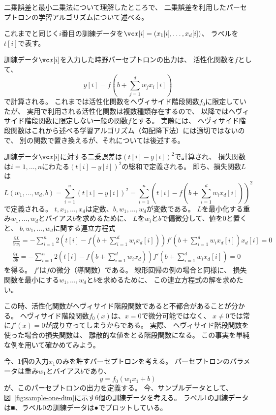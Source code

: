 二乗誤差と最小二乗法について理解したところで、
二乗誤差を利用したパーセプトロンの学習アルゴリズムについて述べる。

これまでと同じく$i$番目の訓練データを$\vc x[i] = (x_1[i], \dots, x_d[i])$、
ラベルを$t[i]$で表す。

訓練データ$\vc x[i]$を入力した時野パーセプトロンの出力は、
活性化関数を$f$として、
\[
  y[i] = f\left(b + \sum_{j=1}^d w_j x_i[i]\right)
\]
で計算される。
これまでは活性化関数をヘヴィサイド階段関数$f_0$に限定していたが、
実用で利用される活性化関数は複数種類存在するので、
以降ではヘヴィサイド階段関数に限定しない一般の関数$f$とする。
実際には、
ヘヴィサイド階段関数はこれから述べる学習アルゴリズム（勾配降下法）には適切ではないので、
別の関数で置き換えるが、それについては後述する。

訓練データ$\vc x[i]$に対する二乗誤差は$(t[i] - y[i])^2$で計算され、
損失関数は$i = 1, \dots, n$にわたる$(t[i] - y[i])^2$の総和で定義される。
即ち、損失関数$L$は
\[
  L(w_1, \dots, w_d, b)
  = \sum_{i=1}^n (t[i] - y[i])^2
  = \sum_{i=1}^n \left(t[i] - f\left(b + \sum_{i=1}^d w_i x_d[i]\right)\right)^2
\]
で定義される。
$t, x_1, \dots, x_d$は定数、$b, w_1, \dots, w_d$が変数である。
$L$を最小化する重み$w_1, \dots, w_d$とバイアス$b$を求めるために、
$L$を$w_i$と$b$で偏微分して、値を0と置くと、
$b, w_1, \dots, w_d$に関する連立方程式
\begin{align}
  &\label{eq:8}
    \frac{\partial L}{\partial w_i}
    = - \sum_{i=1}^n 
    2 \left(t[i] - f\left(b + \sum_{i=1}^d w_i x_d[i]\right)\right)
    f'\left(b + \sum_{i=1}^d w_i x_d[i]\right) x_d[i] = 0
  \\&\label{eq:9}
  \frac{\partial L}{\partial b}
  = - \sum_{i=1}^n 
  2 \left(t[i] - f\left(b + \sum_{i=1}^d w_i x_d\right)\right)
  f'\left(b + \sum_{i=1}^d w_i x_d[i]\right) = 0
\end{align}
を得る。
$f'$は$f$の微分（導関数）である。
線形回帰の例の場合と同様に、
損失関数を最小にする$w_1, \dots, w_d$と$b$を求めるために、
この連立方程式の解を求めたい。

この時、活性化関数がヘヴィサイド階段関数であると不都合があることが分かる。
ヘヴィサイド階段関数$f_0(x)$は、$x = 0$で微分可能ではなく、
$x \neq 0$では常に$f'(x) = 0$が成り立ってしまうからである。
実際、
ヘヴィサイド階段関数を使った場合の損失関数は、
離散的な値をとる階段関数になる。
この事実を単純な例を用いて確かめてみよう。

今、1個の入力$x_1$のみを許すパーセプトロンを考える。
パーセプトロンのパラメータは重み$w_1$とバイアス$b$であり、
\[
  y = f_0(w_1x_1 + b)
\]
が、このパーセプトロンの出力を定義する。
今、サンプルデータとして、図~\ref{fig:sample-one-dim}に示す6個の訓練データを考える。
ラベル1の訓練データは■、ラベル0の訓練データは●でプロットしている。

